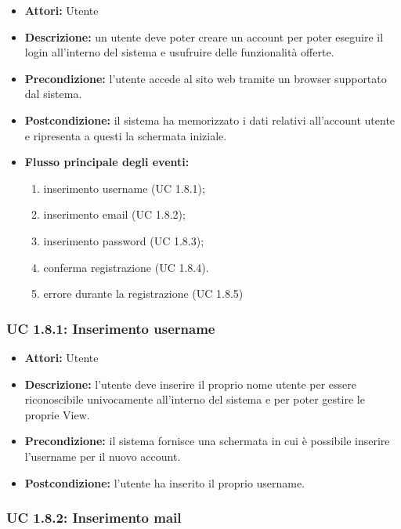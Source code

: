 \begin{itemize}
    \item \textbf{Attori:} Utente
    \item \textbf{Descrizione:} un utente deve poter creare un account per poter eseguire il login
    all’interno del sistema e usufruire delle funzionalità offerte.
    \item \textbf{Precondizione:} l'utente accede al sito web tramite un browser supportato
    dal sistema.
    \item \textbf{Postcondizione:} il sistema ha memorizzato i dati relativi all’account utente e
    ripresenta a questi la schermata iniziale.
    \item \textbf{Flusso principale degli eventi:}

    \begin{enumerate}
        \item inserimento username (UC 1.8.1);
        \item inserimento email (UC 1.8.2);
        \item inserimento password (UC 1.8.3);
        \item conferma registrazione (UC 1.8.4).
        \item errore durante la registrazione (UC 1.8.5)
    \end{enumerate}

\end{itemize}

\subsubsection{UC 1.8.1: Inserimento username}

\begin{itemize}
    \item \textbf{Attori:} Utente
    \item \textbf{Descrizione:} l'utente deve inserire il proprio nome utente per essere riconoscibile univocamente all'interno del sistema e per poter gestire le proprie View.
    \item \textbf{Precondizione:} il sistema fornisce una schermata in cui è possibile inserire l'username per il nuovo account.
    \item \textbf{Postcondizione:} l'utente ha inserito il proprio username.
\end{itemize}

\subsubsection{UC 1.8.2: Inserimento mail}

